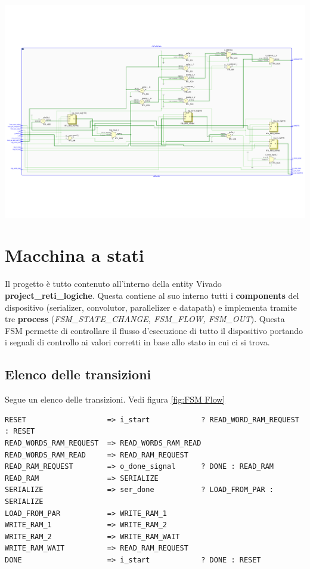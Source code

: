 \documentclass[a4paper]{report}
\begin{document}
\includegraphics[scale = 0.45]{schematics/datapath.pdf}

\section{Macchina a stati}
Il progetto è tutto contenuto all'interno della entity Vivado \textbf{project\_reti\_logiche}. Questa contiene al suo interno tutti i \textbf{components} del dispositivo (serializer, convolutor, parallelizer e datapath) e implementa tramite tre \textbf{process} (\textit{FSM\_STATE\_CHANGE, FSM\_FLOW, FSM\_OUT}). Questa FSM permette di controllare il flusso d'esecuzione di tutto il dispositivo portando i segnali di controllo ai valori corretti in base allo stato in cui ci si trova.

\subsection{Elenco delle transizioni}
Segue un elenco delle transizioni. Vedi figura \ref{fig:FSM Flow}
\begin{verbatim}
RESET                   => i_start            ? READ_WORD_RAM_REQUEST : RESET
READ_WORDS_RAM_REQUEST  => READ_WORDS_RAM_READ
READ_WORDS_RAM_READ     => READ_RAM_REQUEST
READ_RAM_REQUEST        => o_done_signal      ? DONE : READ_RAM
READ_RAM                => SERIALIZE
SERIALIZE               => ser_done           ? LOAD_FROM_PAR : SERIALIZE
LOAD_FROM_PAR           => WRITE_RAM_1        
WRITE_RAM_1             => WRITE_RAM_2
WRITE_RAM_2             => WRITE_RAM_WAIT
WRITE_RAM_WAIT          => READ_RAM_REQUEST
DONE                    => i_start            ? DONE : RESET
\end{verbatim}
\end{document}
